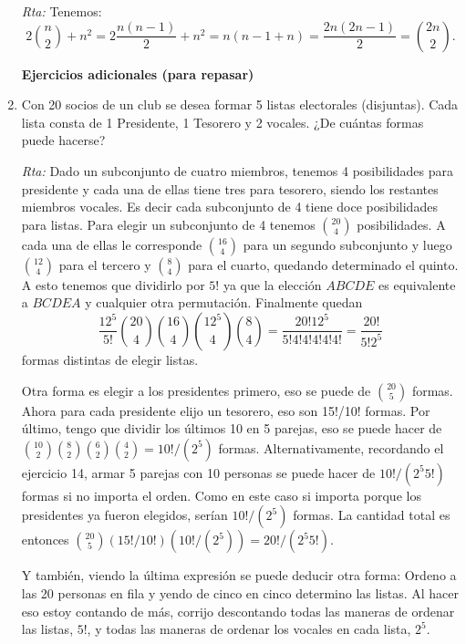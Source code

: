 \documentclass[12pt,spanish,makeidx]{amsbook}
\begin{document}
\begin{enumerate}
\noindent\textit{Rta:} Tenemos: $$2\binom{n}{2}+n^2=2\frac{n(n-1)}{2}+n^2={n(n-1+n)}=\frac{2n(2n-1)}{2}=\binom{2n}{2}.$$

\medskip


\begin{center}
	\textbf{Ejercicios adicionales (para repasar)}
\end{center}


\medskip

\item Con 20 socios de un club se desea formar 5 listas electorales (disjuntas). Cada lista
consta de 1 Presidente, 1 Tesorero y 2 vocales. ¿De cuántas formas puede hacerse?

\noindent\textit{Rta:} Dado un subconjunto de cuatro miembros, tenemos 4 posibilidades para presidente y cada una de ellas tiene tres para tesorero, siendo los restantes miembros vocales. Es decir cada subconjunto de 4 tiene doce posibilidades para listas. Para elegir un subconjunto de 4 tenemos $\binom{20}{4}$ posibilidades. A cada una de ellas le corresponde $\binom{16}{4}$ para un segundo subconjunto y luego $\binom{12}{4}$ para el tercero y $\binom{8}{4}$ para el cuarto, quedando determinado el quinto. A esto tenemos que dividirlo por $5!$ ya que la elección $ABCDE$ es equivalente a  $BCDEA$ y cualquier otra permutación. 
Finalmente quedan $$\frac{12^5}{5!}\binom{20}{4}\binom{16}{4}\binom{12^5}{4}\binom{8}{4}=\frac{20!12^5}{5!4!4!4!4!4!}=\frac{20!}{5!2^5}$$ formas distintas de elegir listas.

Otra forma es elegir a los presidentes primero, eso se puede de $\binom{20}{5}$ formas. Ahora para cada presidente elijo un tesorero, eso son 15!/10! formas. Por último, tengo que dividir los últimos 10 en 5 parejas, eso se puede hacer de ${10 \choose 2} {8 \choose 2} {6 \choose 2} {4 \choose 2} = 10! / ( 2^5)$ formas. Alternativamente, recordando el ejercicio 14, armar 5 parejas con 10 personas se puede hacer de $10! / ( 2^5 5!)$ formas si no importa el orden. Como en este caso si importa porque los presidentes ya fueron elegidos, serían $10! / ( 2^5)$ formas. La cantidad total es entonces $\binom{20}{5} (15! / 10!) ( 10! / ( 2^5) ) = 20! / (2^5 5!)$.

Y también, viendo la última expresión se puede deducir otra forma: Ordeno a las 20 personas en fila y yendo de cinco en cinco determino las listas. Al hacer eso estoy contando de más, corrijo descontando todas las maneras de ordenar las listas, $5!$, y todas las maneras de ordenar los vocales en cada lista, $2^5$.


\end{enumerate}
\end{document}
